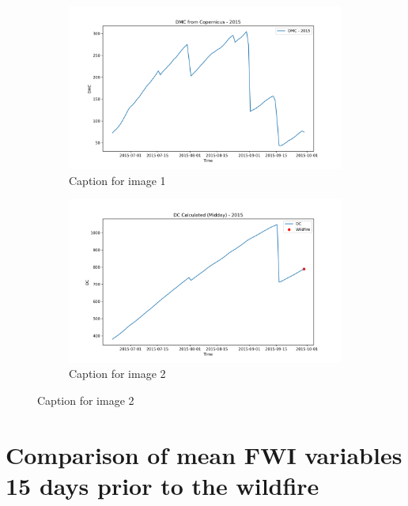 \begin{figure}[h]
\caption{HELLo}
    \centering
    \begin{subfigure}{0.49\textwidth}
        \centering
        \includegraphics[width=\textwidth]{graphs/2015/2015CopernicusDMC12.png}
        \caption{Caption for image 1}
        \label{fig:img1}
    \end{subfigure}
    \hfill
    \begin{subfigure}{0.49\textwidth}
        \centering
        \includegraphics[width=\textwidth]{graphs/2015/2015CalcDC12.png}
        \caption{Caption for image 2}
        \label{fig:img2}
    \end{subfigure}
    \label{fig:both_images}
\end{figure}



\FloatBarrier

\section{Comparison of mean FWI variables 15 days prior to the wildfire}

